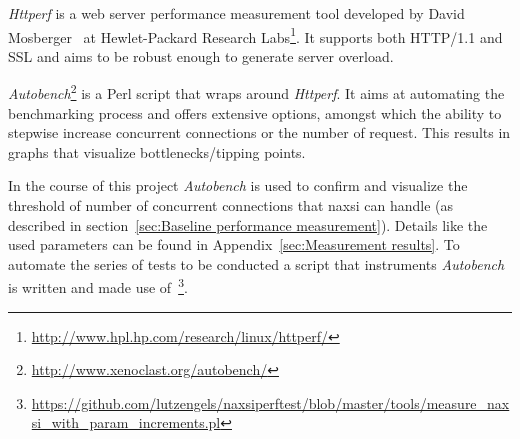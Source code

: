 \emph{Httperf} is a web server performance measurement tool developed by David Mosberger~\cite{mosberger1998httperf} at Hewlet-Packard Research Labs\footnote{\url{http://www.hpl.hp.com/research/linux/httperf/}}. It supports both HTTP/1.1 and SSL and aims to be robust enough to generate server overload.

\emph{Autobench}\footnote{\url{http://www.xenoclast.org/autobench/}} is a Perl script that wraps around \emph{Httperf}. It aims at automating the benchmarking process and offers extensive options, amongst which the ability to stepwise increase concurrent connections or the number of request. This results in graphs that visualize bottlenecks/tipping points.

In the course of this project \emph{Autobench} is used to confirm and visualize the threshold of number of concurrent connections that naxsi can handle (as described in section~\ref{sec:Baseline performance measurement}). Details like the used parameters can be found in Appendix~\ref{sec:Measurement results}. To automate the series of tests to be conducted a script that instruments \emph{Autobench} is written and made use of~\footnote{\url{https://github.com/lutzengels/naxsiperftest/blob/master/tools/measure_naxsi_with_param_increments.pl}}. 
